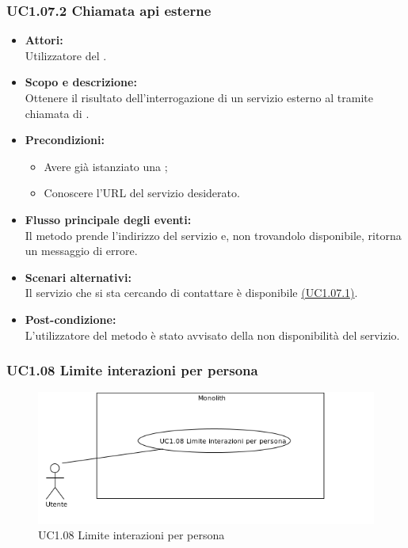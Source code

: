 \subsubsection{UC1.07.2 Chiamata api esterne} \label{UC1.07.2}

\begin{itemize}
	\item \textbf{Attori:}
	\\Utilizzatore del .
	\item \textbf{Scopo e descrizione:} 
	\\Ottenere il risultato dell'interrogazione di un servizio esterno al  tramite chiamata di .
	\item \textbf{Precondizioni:}
	\begin{itemize}
		\item Avere già istanziato una ;
		\item Conoscere l'URL del servizio desiderato.
	\end{itemize}
	\item \textbf{Flusso principale degli eventi:}
	\\Il metodo prende l'indirizzo del servizio e, non trovandolo disponibile, ritorna un messaggio di errore.
	\item \textbf{Scenari alternativi:}
	\\Il servizio che si sta cercando di contattare è disponibile \hyperref[UC1.07.1]{(UC1.07.1)}.
	\item \textbf{Post-condizione:}
	\\L'utilizzatore del metodo è stato avvisato della non disponibilità del servizio.
\end{itemize}

\subsubsection{UC1.08 Limite interazioni per persona} \label{UC1.08}

\begin{figure}[H]
	\centering
	\includegraphics[width=15cm]{../../documenti/AnalisiDeiRequisiti/Diagrammi_img/uc1_08.png}
	\caption{UC1.08 Limite interazioni per persona}
\end{figure}


